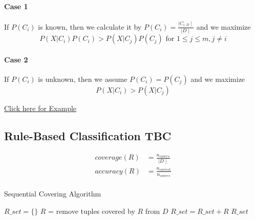 \documentclass{article}
\begin{document}
                \paragraph{Case 1}
                    If $P(C_i)$ is known, then we calculate it by              $\displaystyle P(C_i) = \frac{\mid C_{i,D} \mid}{\mid D \mid}$
                    and we maximize $$P(X|C_i)P(C_i) > P(X|C_j)P(C_j) \text{ for } 1 \leq j \leq m, j \neq i$$

                \paragraph{Case 2}
                    If $P(C_i)$ is unknown, then we assume $P(C_i) = P(C_j)$ and we maximize
                    $$P(X|C_i) > P(X|C_j)$$

                \begin{center}
                    \href{https://github.com/chris24s/COMP3605-Introduction-to-Data-Analytics-Cheat-Sheet/blob/master/Examples/1.%20Classification/Naive%20Baysian%20Classifier%20example.pdf}{Click here for Example}
                \end{center}


            \newpage
            \subsection{Rule-Based Classification TBC}
                \begin{align*}
                    coverage(R) &= \frac{n_{covers}}{\mid D \mid}\\
                    accuracy(R) &= \frac{n_{correct}}{n_{covers}}\\
                \end{align*}

                \begin{algorithm}
                    \caption{Sequential Covering Algorithm}
                    \begin{algorithmic}[1]

                            \State $R\_set = \{\}$
                                \Repeat
                                    \State $R$ = 
                                    \State remove tuples covered by $R$ from $D$
                                    \State $R\_set = R\_set + R$
                            \EndFor
                            \State \Return $R\_set$
                        \EndProcedure
                    \end{algorithmic}
                \end{algorithm}
\end{document}
